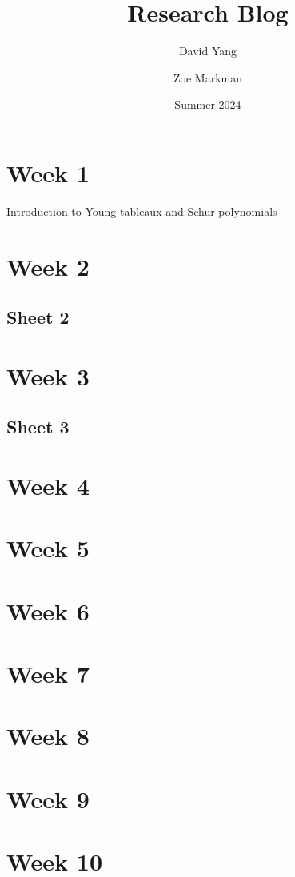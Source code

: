 \documentclass[11pt]{article}
\begin{document}
\title{\textbf{Research Blog}}
\author{David Yang \and Zoe Markman}
\date{Summer 2024}

\maketitle

\section{Week 1}
Introduction to Young tableaux and Schur polynomials

\section{Week 2}


\subsection{Sheet 2}


\newpage

\section{Week 3}


\subsection{Sheet 3}


\newpage

\section{Week 4}


\newpage

\section{Week 5}


\newpage

\section{Week 6}


\newpage
\section{Week 7}


\newpage
\section{Week 8}


\newpage
\section{Week 9}


\newpage
\section{Week 10}

\end{document}
